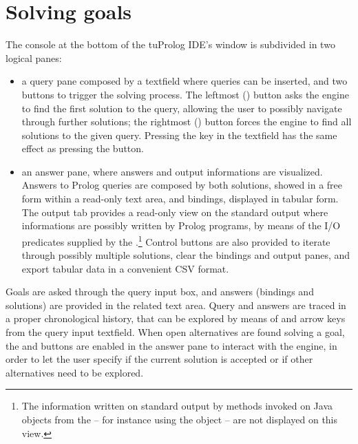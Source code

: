 \section{Solving goals}

The console at the bottom of the tuProlog IDE's window is subdivided in two logical panes:
%
\begin{itemize}
\item a query pane composed by a textfield where queries can be inserted, and two buttons to trigger the solving process.
%
The leftmost () button asks the engine to find the first solution to the query, allowing the user to possibly navigate through further solutions;
%
the rightmost () button forces the engine to find all solutions to the given query.
%
Pressing the  key in the textfield has the same effect as pressing the  button.
\item an answer pane, where answers and output informations are visualized.
%
Answers to Prolog queries are composed by both solutions, showed in a free form within a read-only text area, and bindings, displayed in tabular form.
%
The output tab provides a read-only view on the standard output where informations are possibly written by Prolog programs, by means of the I/O predicates supplied by the .\footnote{The information written on standard output by methods invoked on Java objects from the  -- for instance using the  object -- are not displayed on this view.}
%
Control buttons are also provided to iterate through possibly multiple solutions, clear the bindings and output panes, and export tabular data in a convenient CSV format.
\end{itemize}
%
Goals are asked through the query input box, and answers (bindings and solutions) are provided in the related text area.
%
Query and answers are traced in a proper chronological history, that can be explored by means of  and  arrow keys from the query input textfield.
%
When open alternatives are found solving a goal, the  and  buttons are enabled in the answer pane to interact with the engine, in order to let the user specify if the current solution is accepted or if other alternatives need to be explored.

